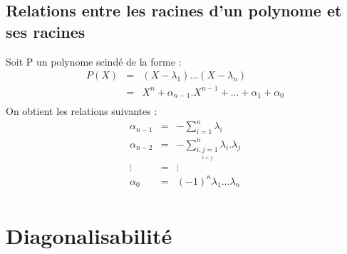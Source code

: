 \subsection{Relations entre les racines d'un polynome et ses racines}
\begin{prop}
Soit P un polynome scindé de la forme : 
\begin{eqnarray*}
  P(X) & = & (X-\lambda_1)\dots(X - \lambda_n)\nonumber \\
   & = & X^n+\alpha_{n-1}.X^{n-1}+...+\alpha_1+\alpha_0 \nonumber \\
\end{eqnarray*}
On obtient les relations suivantes : 
\begin{eqnarray*}
  \alpha_{n-1} & = & -\sum_{i=1}^n \lambda_i \\
  \alpha_{n-2} & = & -\sum_{\underset{i<j}{i,j=1}}^n \lambda_i.\lambda_j \\
  \vdots & = & \vdots\\
  \alpha_0 & = & (-1)^n\lambda_1\dots\lambda_n\\
\end{eqnarray*}
\end{prop}
\section{Diagonalisabilité}
